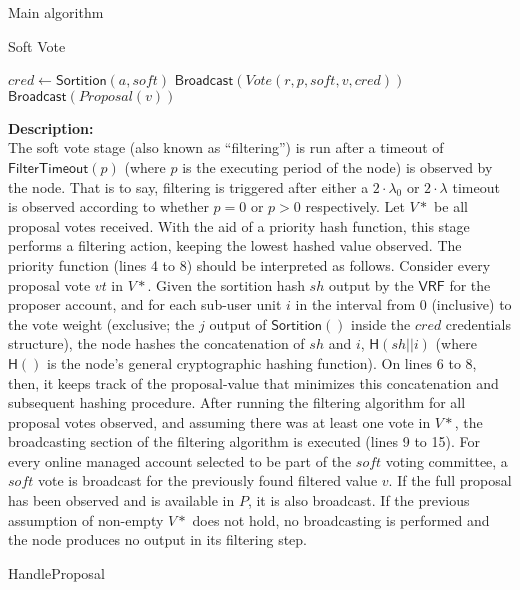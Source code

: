 \documentclass[10pt,a4paper]{article}
\begin{document}
\begin{section}{Main algorithm}
\begin{subsection}{Soft Vote}
\begin{algorithm}[H]
\begin{algorithmic}[1]
            \State $cred \gets \mathsf{Sortition}(a, soft)$
                \State $\mathsf{Broadcast}(Vote(r, p, soft, v, cred))$
                    \State $\mathsf{Broadcast}(Proposal(v))$
                \EndIf
            \EndIf
        \EndFor
    \EndIf

    \EndFunction
    \end{algorithmic}
\end{algorithm}

\noindent \textbf{Description:}\\
The soft vote stage (also known as ``filtering'') is run after a timeout of $\mathsf{FilterTimeout}(p)$
(where $p$ is the executing period of the node) is observed by the node. 
That is to say, filtering is triggered after either a $2\cdot\lambda_0$ or $2\cdot\lambda$ timeout is observed according 
to whether $p=0$ or $p>0$ respectively.
Let $V*$ be all proposal votes received. 
With the aid of a priority hash function, this stage performs a filtering action,
keeping the lowest hashed value observed.
The priority function (lines 4 to 8) should be interpreted as follows. Consider every proposal vote $vt$ in $V*$.
Given the sortition hash $sh$ output by the $\mathsf{VRF}$ for the proposer account, and for each sub-user unit $i$ 
in the interval from $0$ (inclusive) to the vote weight (exclusive; the $j$ output of $\mathsf{Sortition}()$ inside 
the $cred$ credentials structure), the node hashes the concatenation of $sh$ and $i$, $\mathsf{H}(sh||i)$ 
(where $\mathsf{H}()$ is the node's general cryptographic hashing function). On lines 6 to 8, 
then, it keeps track of the proposal-value that minimizes this concatenation and subsequent hashing procedure.
After running the filtering algorithm for all proposal votes observed, and assuming there was at least one vote
in $V*$, the broadcasting section of the filtering algorithm is executed (lines 9 to 15).
For every online managed account selected to be part of the $soft$ voting committee, a $soft$ vote is
broadcast for the previously found filtered value $v$. If the full proposal has been observed and is available in $P$,
it is also broadcast. 
If the previous assumption of non-empty $V*$ does not hold, no broadcasting is performed and the node produces no
output in its filtering step.

\end{subsection}

\begin{subsection}{HandleProposal}\label{ssect:handle-proposal}


\end{subsection}
\end{section}
\end{document}

